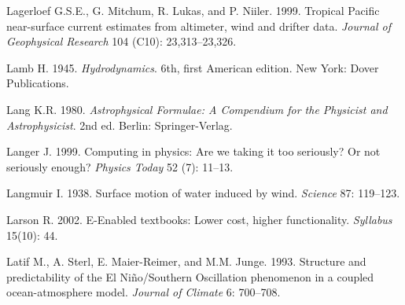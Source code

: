 \begin{thebibliography}{999}
Lagerloef G.S.E., G. Mitchum, R. Lukas, and P. Niiler. 1999. Tropical
Pacific near-surface current estimates from altimeter, wind and
drifter data.  \textit{Journal of Geophysical Research} 104 (C10):
23,313--23,326.
%

Lamb H.  1945. \textit{Hydrodynamics}. 6th, first American
edition. New York: Dover Publications.
%

Lang K.R.  1980. \textit{Astrophysical Formulae: A Compendium for the
  Physicist and Astrophysicist}. 2nd ed.  Berlin: Springer-Verlag.
%

Langer J.  1999. Computing in physics: Are we taking it too seriously?
Or not seriously enough? \textit{Physics Today} 52 (7): 11--13.
%

Langmuir I.  1938. Surface motion of water induced by
wind. \textit{Science} 87: 119--123.
%

Larson R.  2002. E-Enabled textbooks: Lower cost, higher
functionality. \textit{Syllabus} 15(10): 44.
%

Latif M., A. Sterl, E. Maier-Reimer, and M.M. Junge.  1993. Structure
and predictability of the El Ni\~{n}o/Southern Oscillation phenomenon
in a coupled ocean-atmosphere model. \textit{Journal of Climate} 6:
700--708.
%


\end{thebibliography}
